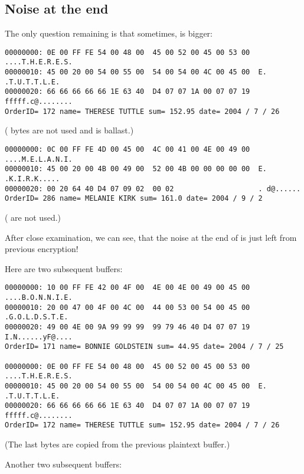 \subsection{Noise at the end}

The only question remaining is that sometimes,  is bigger:

\begin{lstlisting}
00000000: 0E 00 FF FE 54 00 48 00  45 00 52 00 45 00 53 00  ....T.H.E.R.E.S.
00000010: 45 00 20 00 54 00 55 00  54 00 54 00 4C 00 45 00  E. .T.U.T.T.L.E.
00000020: 66 66 66 66 66 1E 63 40  D4 07 07 1A 00 07 07 19  fffff.c@........
OrderID= 172 name= THERESE TUTTLE sum= 152.95 date= 2004 / 7 / 26
\end{lstlisting}

( bytes are not used and is ballast.)

\begin{lstlisting}
00000000: 0C 00 FF FE 4D 00 45 00  4C 00 41 00 4E 00 49 00  ....M.E.L.A.N.I.
00000010: 45 00 20 00 4B 00 49 00  52 00 4B 00 00 00 00 00  E. .K.I.R.K.....
00000020: 00 20 64 40 D4 07 09 02  00 02                    . d@......
OrderID= 286 name= MELANIE KIRK sum= 161.0 date= 2004 / 9 / 2
\end{lstlisting}

( are not used.)

After close examination, we can see, that the noise at the end of  is just left
from previous encryption!

Here are two subsequent buffers:

\begin{lstlisting}
00000000: 10 00 FF FE 42 00 4F 00  4E 00 4E 00 49 00 45 00  ....B.O.N.N.I.E.
00000010: 20 00 47 00 4F 00 4C 00  44 00 53 00 54 00 45 00   .G.O.L.D.S.T.E.
00000020: 49 00 4E 00 9A 99 99 99  99 79 46 40 D4 07 07 19  I.N......yF@....
OrderID= 171 name= BONNIE GOLDSTEIN sum= 44.95 date= 2004 / 7 / 25

00000000: 0E 00 FF FE 54 00 48 00  45 00 52 00 45 00 53 00  ....T.H.E.R.E.S.
00000010: 45 00 20 00 54 00 55 00  54 00 54 00 4C 00 45 00  E. .T.U.T.T.L.E.
00000020: 66 66 66 66 66 1E 63 40  D4 07 07 1A 00 07 07 19  fffff.c@........
OrderID= 172 name= THERESE TUTTLE sum= 152.95 date= 2004 / 7 / 26
\end{lstlisting}

(The last  bytes are copied from the previous plaintext buffer.)

Another two subsequent buffers:

